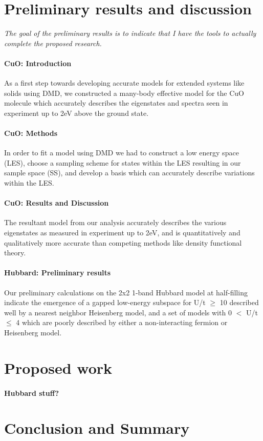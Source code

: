 \documentclass{article}
\begin{document}
\pagebreak

\section{Preliminary results and discussion}
\textit{The goal of the preliminary results is to indicate that I have the tools to actually complete the proposed research.}

\paragraph{CuO: Introduction} As a first step towards developing accurate models for extended systems like solids using DMD, we constructed a many-body effective model for the CuO molecule which accurately describes the eigenstates and spectra seen in experiment up to 2eV above the ground state. 

\paragraph{CuO: Methods} In order to fit a model using DMD we had to construct a low energy space (LES), choose a sampling scheme for states within the LES resulting in our sample space (SS), and develop a basis which can accurately describe variations within the LES.

\paragraph{CuO: Results and Discussion} The resultant model from our analysis accurately describes the various eigenstates as measured in experiment up to 2eV, and is quantitatively and qualitatively more accurate than competing methods like density functional theory.

\paragraph{Hubbard: Preliminary results} Our preliminary calculations on the 2x2 1-band Hubbard model at half-filling indicate the emergence of a gapped low-energy subspace for U/t $\ge$ 10 described well by a nearest neighbor Heisenberg model, and a set of models with 0 $<$ U/t $\leq$ 4 which are poorly described by either a non-interacting fermion or Heisenberg model.

\section{Proposed work}
\paragraph{Hubbard stuff?}


\section{Conclusion and Summary}
\end{document}
